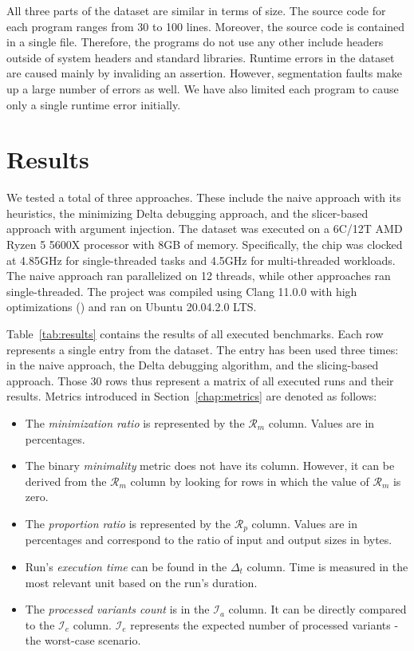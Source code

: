 All three parts of the dataset are similar in terms of size. 
The source code for each program ranges from 30 to 100 lines. 
Moreover, the source code is contained in a single file. 
Therefore, the programs do not use any other include headers outside of 
system headers and standard libraries. 
Runtime errors in the dataset are caused mainly by invaliding an assertion. 
However, segmentation faults make up a large number of errors as well. 
We have also limited each program to cause only a single runtime error 
initially.

\section{Results}

We tested a total of three approaches. 
These include the naive approach with its heuristics, the minimizing Delta 
debugging approach, and the slicer-based approach 
with argument injection. 
The dataset was executed on a 6C/12T AMD Ryzen 5 5600X processor with 8GB of 
memory. 
Specifically, the chip was clocked at 4.85GHz for single-threaded tasks and 
4.5GHz for multi-threaded workloads. 
The naive approach ran parallelized on 12 threads, while other approaches 
ran single-threaded. 
The project was compiled using Clang 11.0.0 with high optimizations 
() and ran on Ubuntu 20.04.2.0 LTS.

Table~\ref{tab:results} contains the results of all executed benchmarks. 
Each row represents a single entry from the dataset. 
The entry has been used three times: in the naive approach, the Delta 
debugging algorithm, and the slicing-based approach. 
Those 30 rows thus represent a matrix of all executed runs and their results. 
Metrics introduced in Section~\ref{chap:metrics} are denoted as follows:
\begin{itemize}
  \item The \emph{minimization ratio} is represented by the $\mathcal{R}_m$ 
  column. 
  Values are in percentages.
  \item The binary \emph{minimality} metric does not have its column. 
  However, it can be derived from the $\mathcal{R}_m$ column by looking for 
  rows in which the value of $\mathcal{R}_m$ is zero.
  \item The \emph{proportion ratio} is represented by the $\mathcal{R}_p$ 
  column. 
  Values are in percentages and correspond to the ratio of input and output 
  sizes in bytes.
  \item Run's \emph{execution time} can be found in the $\Delta_t$ column. 
  Time is measured in the most relevant unit based on the run's duration.
  \item The \emph{processed variants count} is in the $\mathcal{I}_a$ column. 
  It can be directly compared to the $\mathcal{I}_e$ column. 
  $\mathcal{I}_e$ represents the expected number of processed variants - 
  the worst-case scenario.
\end{itemize}

